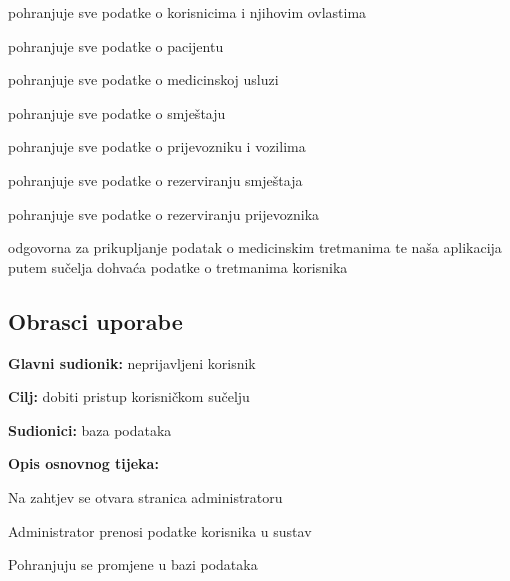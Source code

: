 \begin{packed_enum}
		\begin{packed_enum}
			
			\item pohranjuje sve podatke o korisnicima i njihovim ovlastima 
			\item pohranjuje sve podatke o pacijentu
			\item pohranjuje sve podatke o medicinskoj usluzi 
			\item pohranjuje sve podatke o smještaju 
			\item pohranjuje sve podatke o prijevozniku i vozilima
			\item pohranjuje sve podatke o rezerviranju smještaja 
			\item pohranjuje sve podatke o rezerviranju prijevoznika 
			
		\end{packed_enum}
		
		\item  {}
		
		\begin{packed_enum}
			
			\item odgovorna za prikupljanje podatak o medicinskim tretmanima te naša aplikacija putem sučelja dohvaća podatke o tretmanima korisnika
			
		\end{packed_enum}
		
		
	\end{packed_enum}
	
	\eject 
			
			
				
			\subsection{Obrasci uporabe}				
					
					\noindent {}
					\begin{packed_item}
	
						\item \textbf{Glavni sudionik:} neprijavljeni  korisnik
						\item  \textbf{Cilj:} dobiti pristup korisničkom sučelju 
						\item  \textbf{Sudionici:} baza podataka
						\item  \textbf{Opis osnovnog tijeka:}
						
						\item[] \begin{packed_enum}
	
							\item Na zahtjev se otvara stranica administratoru
							\item Administrator prenosi podatke korisnika u sustav
							\item Pohranjuju se promjene u bazi podataka
						\end{packed_enum}
						
					\end{packed_item}


